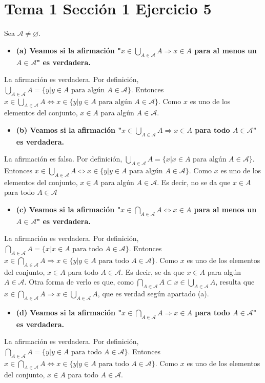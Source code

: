 \documentclass{article}
\begin{document}
\section{Tema 1 Sección 1 Ejercicio 5}
Sea $\mathcal{A}\neq \varnothing$. 
\begin{itemize}
\item \bf (a) \rm Veamos si la afirmación "$x\in \bigcup_{A\in \mathcal{A}} A\Rightarrow x\in A$ para al menos un  $A\in \mathcal{A}$" es verdadera.
\end{itemize}
La afirmación es verdadera. Por definición, $\bigcup_{A\in \mathcal{A}}A=\{y|y\in A \text{ para algún }A\in \mathcal{A}\}$. Entonces $x\in \bigcup_{A\in \mathcal{A}}A\Leftrightarrow x\in \{y|y\in A \text{ para algún }A\in \mathcal{A}\}$. Como $x$ es uno de los elementos del conjunto, $x\in A$ para algún $A\in \mathcal{A}$.
\begin{itemize}
\item \bf (b) \rm Veamos si la afirmación "$x\in \bigcup_{A\in \mathcal{A}} A\Rightarrow x\in A$ para todo  $A\in \mathcal{A}$" es verdadera.
\end{itemize}
La afirmación es falsa. Por definición, $\bigcup_{A\in \mathcal{A}}A=\{x|x\in A \text{ para algún }A\in \mathcal{A}\}$. Entonces $x\in \bigcup_{A\in \mathcal{A}}A\Leftrightarrow x\in \{y|y\in A \text{ para algún }A\in \mathcal{A}\}$. Como $x$ es uno de los elementos del conjunto, $x\in A$ para algún $A\in \mathcal{A}$. Es decir, no se da que $x\in A$ para todo $A\in \mathcal{A}$
\begin{itemize}
\item \bf (c) \rm Veamos si la afirmación "$x\in \bigcap_{A\in \mathcal{A}} A\Leftrightarrow x\in A$ para al menos un $A\in \mathcal{A}$" es verdadera. 
\end{itemize}
La afirmación es verdadera. Por definición, $\bigcap_{A\in \mathcal{A}}A=\{x|x\in A \text{ para todo }A\in \mathcal{A}\}$. Entonces $x\in \bigcap_{A\in \mathcal{A}}A\Rightarrow x\in \{y|y\in A \text{ para todo }A\in \mathcal{A}\}$. Como $x$ es uno de los elementos del conjunto, $x\in A$ para todo $A\in \mathcal{A}$. Es decir, se da que $x\in A$ para algún $A\in \mathcal{A}$. Otra forma de verlo es que, como $\bigcap_{A\in \mathcal{A}}A\subset x\in\bigcup_{A\in \mathcal{A}}A$, resulta que $x\in \bigcap_{A\in \mathcal{A}}A\Rightarrow x\in\bigcup_{A\in \mathcal{A}}A$, que es verdad según apartado (a).
\begin{itemize}
\item \bf (d) \rm Veamos si la afirmación "$x\in \bigcap_{A\in \mathcal{A}} A\Rightarrow x\in A$ para todo $A\in \mathcal{A}$" es verdadera.
\end{itemize}
La afirmación es verdadera. Por definición, $\bigcap_{A\in \mathcal{A}}A=\{y|y\in A \text{ para todo }A\in \mathcal{A}\}$. Entonces $x\in \bigcap_{A\in \mathcal{A}}A\Leftrightarrow x\in \{y|y\in A \text{ para todo }A\in \mathcal{A}\}$. Como $x$ es uno de los elementos del conjunto, $x\in A$ para todo $A\in \mathcal{A}$.
\end{document}
